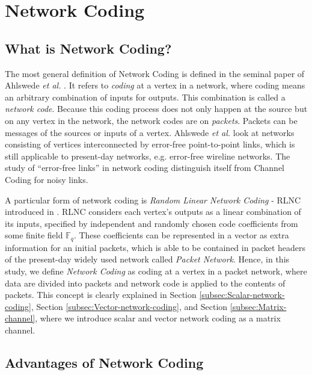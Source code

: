 \chapter{Network Coding} \label{chap:network_coding}

\section{What is Network Coding?}

The most general definition of Network Coding is defined in the seminal
paper of Ahlswede \textit{et al.} \cite{Ahlswede:2000}. It refers
to \textit{coding} at a vertex in a network, where coding means an
arbitrary combination of inputs for outputs. This combination is called
a \textit{network code}. Because this coding process does not only
happen at the source but on any vertex in the network, the network
codes are on \textit{packets}. Packets can be messages of the sources
or inputs of a vertex. Ahlswede \textit{et al.} look at networks consisting
of vertices interconnected by error-free point-to-point links, which
is still applicable to present-day networks, e.g. error-free wireline
networks. The study of ``error-free links'' in network coding distinguish
itself from Channel Coding for noisy links.

A particular form of network coding is \textit{Random Linear Network
Coding} - RLNC introduced in \cite{Ho:2003}. RLNC considers each
vertex's outputs as a linear combination of its inputs, specified
by independent and randomly chosen code coefficients from some finite
field $\ensuremath{\mathbb{F}}_{q}$. These coefficients can be represented
in a vector as extra information for an initial packets, which is
able to be contained in packet headers of the present-day widely used
network called \textit{Packet Network}. Hence, in this study, we define
\textit{Network Coding} as coding at a vertex in a packet network,
where data are divided into packets and network code is applied to
the contents of packets. This concept is clearly explained in Section
\ref{subsec:Scalar-network-coding}, Section \ref{subsec:Vector-network-coding},
and Section \ref{subsec:Matrix-channel}, where we introduce scalar
and vector network coding as a matrix channel.

\section{Advantages of Network Coding}

